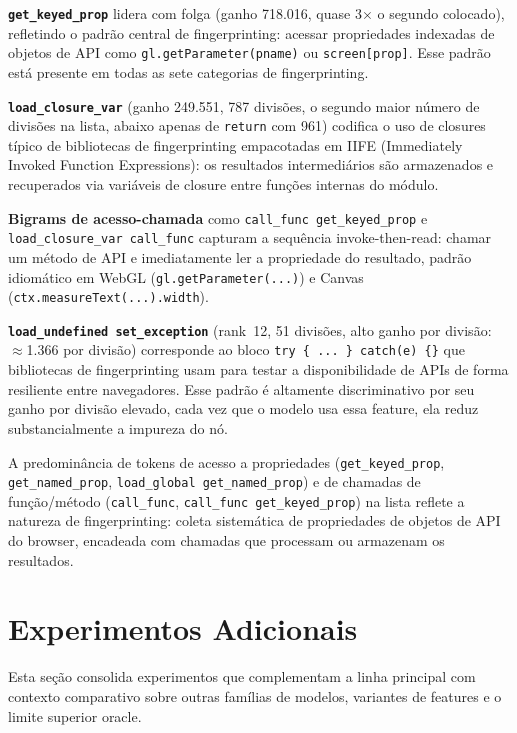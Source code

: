 \textbf{\texttt{get\_keyed\_prop}} lidera com folga (ganho 718.016, quase 3$\times$
o segundo colocado), refletindo o padrão central de fingerprinting: acessar
propriedades indexadas de objetos de API como \texttt{gl.getParameter(pname)} ou
\texttt{screen[prop]}. Esse padrão está presente em todas as sete categorias de
fingerprinting.

\textbf{\texttt{load\_closure\_var}} (ganho 249.551, 787 divisões, o segundo maior
número de divisões na lista, abaixo apenas de \texttt{return} com 961) codifica o uso de closures típico de
bibliotecas de fingerprinting empacotadas em IIFE (Immediately Invoked
Function Expressions): os resultados intermediários são armazenados e recuperados
via variáveis de closure entre funções internas do módulo.

\textbf{Bigrams de acesso-chamada} como \texttt{call\_func get\_keyed\_prop} e
\texttt{load\_closure\_var call\_func} capturam a sequência invoke-then-read:
chamar um método de API e imediatamente ler a propriedade do resultado, padrão
idiomático em WebGL (\texttt{gl.getParameter(...)}) e Canvas
(\texttt{ctx.measureText(...).width}).

\textbf{\texttt{load\_undefined set\_exception}} (rank~12, 51 divisões, alto ganho
por divisão: $\approx$1.366 por divisão) corresponde ao bloco
\texttt{try \{ ... \} catch(e) \{\}} que bibliotecas de fingerprinting usam
para testar a disponibilidade de APIs de forma resiliente entre navegadores. Esse
padrão é altamente discriminativo por seu ganho por divisão elevado, cada vez
que o modelo usa essa feature, ela reduz substancialmente a impureza do nó.

A predominância de tokens de acesso a propriedades (\texttt{get\_keyed\_prop},
\texttt{get\_named\_prop}, \texttt{load\_global get\_named\_prop}) e de chamadas
de função/método (\texttt{call\_func}, \texttt{call\_func get\_keyed\_prop}) na
lista reflete a natureza de fingerprinting: coleta sistemática de
propriedades de objetos de API do browser, encadeada com chamadas que processam ou
armazenam os resultados.

\section{Experimentos Adicionais}
\label{sec:adicionais}

Esta seção consolida experimentos que complementam a linha principal com contexto
comparativo sobre outras famílias de modelos, variantes de features e o limite
superior oracle.


